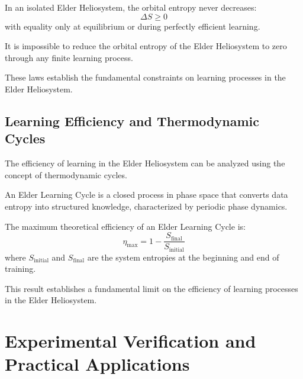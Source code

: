 \begin{theorem}
In an isolated Elder Heliosystem, the orbital entropy never decreases:
\begin{equation}
\Delta S \geq 0
\end{equation}
with equality only at equilibrium or during perfectly efficient learning.
\end{theorem}

\begin{theorem}
It is impossible to reduce the orbital entropy of the Elder Heliosystem to zero through any finite learning process.
\end{theorem}

These laws establish the fundamental constraints on learning processes in the Elder Heliosystem.

\subsection{Learning Efficiency and Thermodynamic Cycles}

The efficiency of learning in the Elder Heliosystem can be analyzed using the concept of thermodynamic cycles.

\begin{definition}
An Elder Learning Cycle is a closed process in phase space that converts data entropy into structured knowledge, characterized by periodic phase dynamics.
\end{definition}

\begin{theorem}
The maximum theoretical efficiency of an Elder Learning Cycle is:
\begin{equation}
\eta_{\text{max}} = 1 - \frac{S_{\text{final}}}{S_{\text{initial}}}
\end{equation}
where $S_{\text{initial}}$ and $S_{\text{final}}$ are the system entropies at the beginning and end of training.
\end{theorem}

This result establishes a fundamental limit on the efficiency of learning processes in the Elder Heliosystem.

\section{Experimental Verification and Practical Applications}

